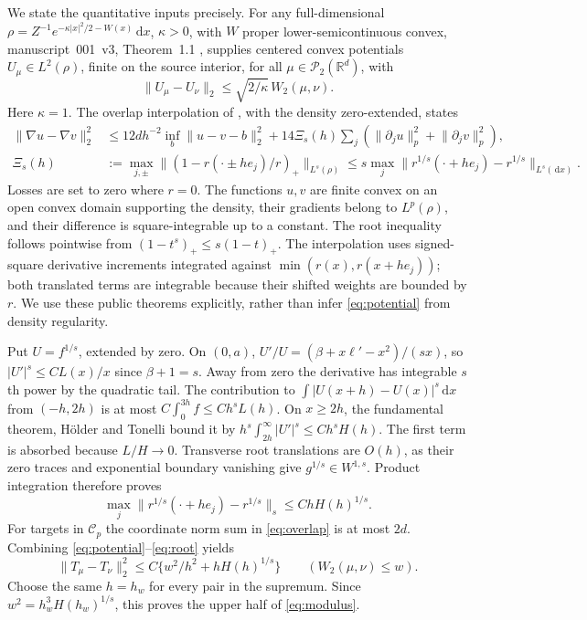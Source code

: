 \documentclass[11pt]{article}
\theoremstyle{remark}\newtheorem{remark}[theorem]{Remark}
\newcommand{\R}{\mathbb R}
\newcommand{\dd}{\,\mathrm d}
\newcommand{\norm}[1]{\lVert#1\rVert}
\newcommand{\PP}{\mathcal P_2}
\begin{document}
We state the quantitative inputs precisely. For any full-dimensional
$\rho=Z^{-1}e^{-\kappa|x|^2/2-W(x)}\dd x$, $\kappa>0$, with $W$ proper lower-semicontinuous convex, manuscript~001~v3, Theorem~1.1 \cite{Potential}, supplies centered convex potentials $U_\mu\in L^2(\rho)$, finite on the source interior, for all $\mu\in\PP(\R^d)$, with
\begin{equation}\label{eq:potential}
 \norm{U_\mu-U_\nu}_2\le\sqrt{2/\kappa}\,W_2(\mu,\nu).
\end{equation}
Here $\kappa=1$. The overlap interpolation of \cite[Theorem~2.2 and Lemma~2.1]{Overlap}, with the density zero-extended, states
\begin{align}
 \norm{\nabla u-\nabla v}_2^2
 &\le12dh^{-2}\inf_b\norm{u-v-b}_2^2
 +14\Xi_s(h)\sum_j(\norm{\partial_ju}_p^2+\norm{\partial_jv}_p^2),\label{eq:overlap}\\
 \Xi_s(h)&:=\max_{j,\pm}
 \norm{(1-r(\cdot\pm he_j)/r)_+}_{L^s(\rho)}
 \le s\max_j\norm{r^{1/s}(\cdot+he_j)-r^{1/s}}_{L^s(\dd x)}.\label{eq:root}
\end{align}
Losses are set to zero where $r=0$. The functions $u,v$ are finite convex on an open convex domain supporting the density, their gradients belong to $L^p(\rho)$, and their difference is square-integrable up to a constant. The root inequality follows pointwise from $(1-t^s)_+\le s(1-t)_+$. The interpolation uses signed-square derivative increments integrated against $\min(r(x),r(x+he_j))$; both translated terms are integrable because their shifted weights are bounded by $r$. We use these public theorems explicitly, rather than infer \eqref{eq:potential} from density regularity.

Put $U=f^{1/s}$, extended by zero. On $(0,a)$,
$U'/U=(\beta+x\ell'-x^2)/(sx)$, so $|U'|^s\le C L(x)/x$ since $\beta+1=s$. Away from zero the derivative has integrable $s$th power by the quadratic tail. The contribution to $\int|U(x+h)-U(x)|^s\dd x$ from $(-h,2h)$ is at most $C\int_0^{3h}f\le Ch^sL(h)$. On $x\ge2h$, the fundamental theorem, Hölder and Tonelli bound it by
$h^s\int_{2h}^\infty|U'|^s\le Ch^sH(h)$.
The first term is absorbed because $L/H\to0$. Transverse root translations are $O(h)$, as their zero traces and exponential boundary vanishing give $g^{1/s}\in W^{1,s}$. Product integration therefore proves
\[
 \max_j\norm{r^{1/s}(\cdot+he_j)-r^{1/s}}_s
 \le ChH(h)^{1/s}.
\]
For targets in $\mathcal C_p$ the coordinate norm sum in \eqref{eq:overlap} is at most $2d$. Combining \eqref{eq:potential}--\eqref{eq:root} yields
\begin{equation}\label{eq:upper}
 \norm{T_\mu-T_\nu}_2^2\le C\{w^2/h^2+hH(h)^{1/s}\}
 \qquad(W_2(\mu,\nu)\le w).
\end{equation}
Choose the same $h=h_w$ for every pair in the supremum. Since $w^2=h_w^3H(h_w)^{1/s}$, this proves the upper half of \eqref{eq:modulus}.
\end{document}
